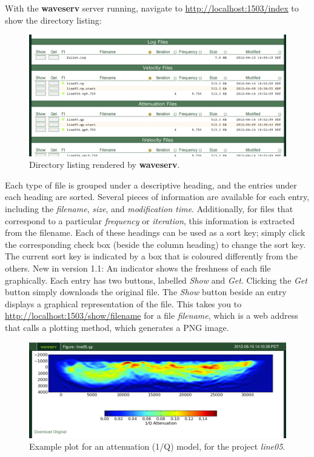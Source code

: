 \documentclass[letterpaper,10pt,english]{sphinxmanual}
\begin{document}
With the \textbf{waveserv} server running, navigate to \href{http://localhost:1503/index}{http://localhost:1503/index} to show the directory listing:
\begin{figure}[htbp]
\centering
\capstart

\includegraphics{listing4.png}
\caption{Directory listing rendered by \textbf{waveserv}.}\end{figure}

Each type of file is grouped under a descriptive heading, and the entries under each heading are sorted.  Several pieces of information are available for each entry, including the \emph{filename}, \emph{size}, and \emph{modification time}.  Additionally, for files that correspond to a particular \emph{frequency} or \emph{iteration}, this information is extracted from the filename.  Each of these headings can be used as a sort key; simply click the corresponding check box (beside the column heading) to change the sort key.  The current sort key is indicated by a box that is coloured differently from the others.
New in version 1.1: An indicator shows the freshness of each file graphically.
Each entry has two buttons, labelled \emph{Show} and \emph{Get}.  Clicking the \emph{Get} button simply downloads the original file.  The \emph{Show} button beside an entry displays a graphical representation of the file.  This takes you to \href{http://localhost:1503/show/filename}{http://localhost:1503/show/filename} for a file \emph{filename}, which is a web address that calls a plotting method, which generates a PNG image.
\begin{figure}[htbp]
\centering
\capstart

\includegraphics{qpmodel1.png}
\caption{Example plot for an attenuation (1/Q) model, for the project \emph{line05}.}\end{figure}
\end{document}

